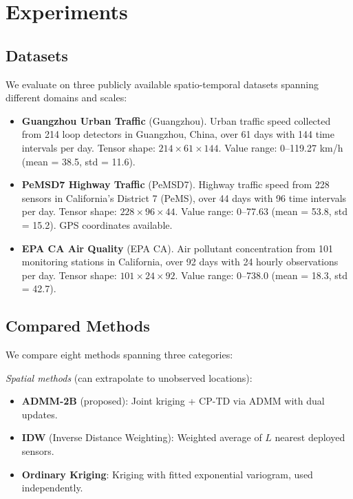 \documentclass[journal]{IEEEtran}
\begin{document}
\section{Experiments}\label{sec:experiments}

\subsection{Datasets}

We evaluate on three publicly available spatio-temporal datasets spanning different domains and scales:

\begin{itemize}
\item \textbf{Guangzhou Urban Traffic} (Guangzhou). Urban traffic speed collected from 214 loop detectors in Guangzhou, China, over 61 days with 144 time intervals per day. Tensor shape: $214 \times 61 \times 144$. Value range: 0--119.27 km/h (mean = 38.5, std = 11.6).

\item \textbf{PeMSD7 Highway Traffic} (PeMSD7). Highway traffic speed from 228 sensors in California's District 7 (PeMS), over 44 days with 96 time intervals per day. Tensor shape: $228 \times 96 \times 44$. Value range: 0--77.63 (mean = 53.8, std = 15.2). GPS coordinates available.

\item \textbf{EPA CA Air Quality} (EPA CA). Air pollutant concentration from 101 monitoring stations in California, over 92 days with 24 hourly observations per day. Tensor shape: $101 \times 24 \times 92$. Value range: 0--738.0 (mean = 18.3, std = 42.7).
\end{itemize}

\subsection{Compared Methods}

We compare eight methods spanning three categories:

\emph{Spatial methods} (can extrapolate to unobserved locations):
\begin{itemize}
\item \textbf{ADMM-2B} (proposed): Joint kriging + CP-TD via ADMM with dual updates.
\item \textbf{IDW} (Inverse Distance Weighting): Weighted average of $L$ nearest deployed sensors.
\item \textbf{Ordinary Kriging}: Kriging with fitted exponential variogram, used independently.
\end{itemize}
\end{document}
